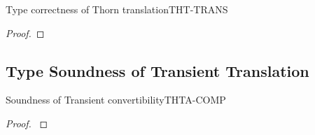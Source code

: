 \documentclass[acmlarge, anonymous, authordraft, review]{acmart} %
\begin{document}
\begin{lemma}{Type correctness of Thorn translation}{THT-TRANS}
\begin{proof}
  \end{proof}
\end{lemma}


\subsection*{Type Soundness of Transient Translation}

\begin{lemma}{Soundness of Transient convertibility}{THTA-COMP}
  \begin{conds}
    \cond{$\EnvTypeS\Env\K\e\t$}
    \cond{$\ep = \TRG{\e}\Env$}
    \cond{$\TR\K = \Kp$}
    \cond{$\TR\Env = \Envp$}
    \cond{$\EnvType\Envp\cdot\Kp{\ep}{\t}$}
  \end{conds}
  \then\axiom{$\EnvType\Envp\cdot\Kp{\TAG\e\Env{\tp}}{\kty\tp}$}

  \begin{proof}{ \indmsg{$\Convertible\K\t\tp$}}

% 
% 
% 

  \end{proof}
\end{lemma}
\end{document}

